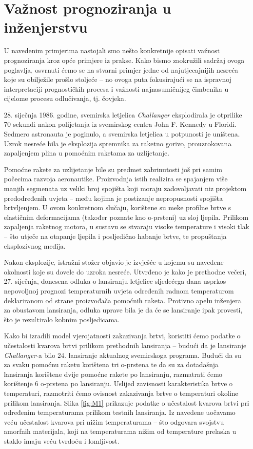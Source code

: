 \documentclass[a4paper,12pt,oneside]{memoir}
\begin{document}
        \section{Važnost prognoziranja u inženjerstvu}
            U navedenim primjerima nastojali smo nešto konkretnije opisati važnost prognoziranja kroz opće primjere iz prakse. Kako bismo zaokružili sadržaj ovoga poglavlja, osvrnuti ćemo se na stvarni primjer jedne od najutjecajnijih nesreća koje su obilježile prošlo stoljeće --  no ovoga puta fokusirajući se na ispravnoj interpretaciji prognostičkih procesa i važnosti najnasumičnijeg čimbenika u cijelome procesu odlučivanja, tj. čovjeka.


            28. siječnja 1986. godine, svemirska letjelica \textit{Challanger} eksplodirala je otprilike 70 sekundi nakon polijetanja iz svemirskog centra John F. Kennedy u Floridi. Sedmero astronauta je poginulo, a svemirska letjelica u potpunosti je uništena. Uzrok nesreće bila je eksplozija spremnika za raketno gorivo, prouzrokovana zapaljenjem plina u pomoćnim raketama za uzlijetanje.

            Pomoćne rakete za uzlijetanje bile su predmet zabrinutosti još pri samim počecima razvoja aeronautike. Proizvodnja istih realizira se spajanjem više manjih segmenata uz veliki broj spojišta koji moraju zadovoljavati niz projektom predodređenih uvjeta -- među kojima je postizanje nepropusnosti spojišta brtvljenjem. U ovom konkretnom slučaju, korištene su meke profilne brtve s elastičnim deformacijama (također poznate kao o-prsteni) uz sloj ljepila. Prilikom zapaljenja raketnog motora, u sustavu se stvaraju visoke temperature i visoki tlak -- što utječe na otapanje ljepila i posljedično habanje brtve, te propuštanja eksplozivnog medija.

            Nakon eksplozije, istražni stožer objavio je izvješće u kojemu su navedene okolnosti koje su dovele do uzroka nesreće. Utvrđeno je kako je prethodne večeri, 27. siječnja, donesena odluka o lansiranju letjelice sljedećega dana usprkos nepovoljnoj prognozi temperaturnih uvjeta određenih radnom temperaturom deklariranom od strane proizvođača pomoćnih raketa. Protivno apelu inženjera za obustavom lansiranja, odluka uprave bila je da će se lansiranje ipak provesti, što je rezultiralo kobnim posljedicama.


            Kako bi izradili model vjerojatnosti zakazivanja brtvi, koristiti ćemo podatke o učestalosti kvarova brtvi prilikom prethodnih lansiranja -- budući da je lansiranje \textit{Challanger}-a bilo 24. lansiranje aktualnog svemirskoga programa. Budući da su za svaku pomoćnu raketu korištena tri o-prstena te da su za dotadašnja lansiranja korištene dvije pomoćne rakete po lansiranju, razmatrati ćemo korištenje 6 o-prstena po lansiranju. Uslijed zavisnosti karakteristika brtve o temperaturi, razmotriti ćemo ovisnost zakazivanja brtve o temperaturi okoline prilikom lansiranja. Slika \ref{fig:M1} prikazuje podatke o učestalost kvarova brtvi pri određenim temperaturama prilikom testnih lansiranja. Iz navedene uočavamo veću učestalost kvarova pri nižim temperaturama -- što odgovara svojstvu amorfnih materijala, koji na temperaturama nižim od temperature prelaska u staklo imaju veću tvrdoću i lomljivost.
\end{document}
